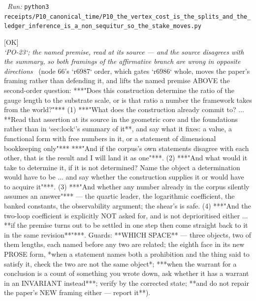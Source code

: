 \begin{description}
\ \emph{Run:} \texttt{python3 receipts/P10\_canonical\_time/P10\_the\_vertex\_cost\_is\_the\_splits\_and\_the\_ledger\_inference\_is\_a\_non\_sequitur\_so\_the\_stake\_moves.py}
\item[\rcptlabel{P10_the_ratio_is_read_from_the_world_so_the_premise_is_supplied_and_both_framings_are_wrong}{P10R42}\textbf{P10R42}\quad\texttt{P10\_the\_ratio\_is\_read\_from\_the\_world\_so\_the\_premise\_is\_supplied\_and\_both\_framings\_are\_wrong}]\hfill\textsf{[OK]}\\
\textit{`PO-23`; the named premise, read at its source --- and the source disagrees with the summary, so both framings of the affirmative branch are wrong in opposite directions} \ (node 66's `r6987` order, which gates `r6986` whole, moves the paper's framing rather than defending it, and lifts the named premise ABOVE the second-order question: ***"Does this construction determine the ratio of the gauge length to the substrate scale, or is that ratio a number the framework takes from the world?"*** (1) ***"What does the construction already commit to? ... **Read that assertion at its source in the geometric core and the foundations rather than in `sec:lock`'s summary of it**, and say what it fixes: a value, a functional form with free numbers in it, or a statement of dimensional bookkeeping only"***  ***"And if the corpus's own statements disagree with each other, that is the result and I will land it as one"***. (2) ***"And what would it take to determine it, if it is not determined? Name the object a determination would have to be ... and say whether the construction supplies it or would have to acquire it"***. (3) ***"And whether any number already in the corpus silently assumes an answer"*** --- the quartic leader, the logarithmic coefficient, the banked constants, the observability argument; the shear's is safe. (4) ***"And the two-loop coefficient is explicitly NOT asked for, and is not deprioritised either ... **if the premise turns out to be settled in one step then come straight back to it in the same revision**"***.  Guards: **WHICH SPACE** --- three objects, two of them lengths, each named before any two are related; the eighth face in its new PROSE form, *when a statement names both a prohibition and the thing said to satisfy it, check the two are not the same object*; ***when the warrant for a conclusion is a count of something you wrote down, ask whether it has a warrant in an INVARIANT instead***; verify by the corrected state; **and do not repair the paper's NEW framing either --- report it**). 

\end{description}
